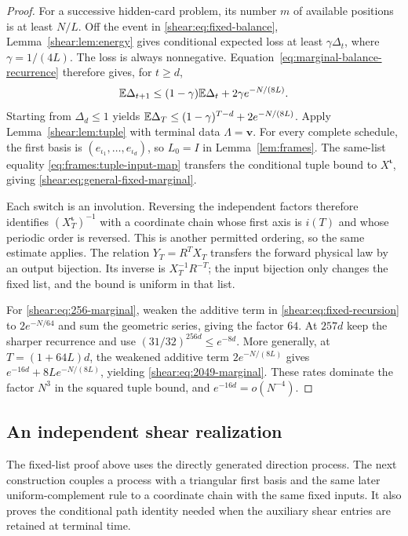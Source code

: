 \begin{proof}
For a successive hidden-card problem, its number $m$ of
available positions is at least $N/L$. Off the event in
\eqref{shear:eq:fixed-balance}, Lemma~\ref{shear:lem:energy}
gives conditional expected loss at least
$\gamma\Delta_t$, where $\gamma=1/(4L)$. The loss is always
nonnegative. Equation~\eqref{eq:marginal-balance-recurrence}
therefore gives, for $t\ge d$,
\begin{equation}\label{shear:eq:fixed-recursion}
 \mathbb E\Delta_{t+1}\le(1-\gamma)\mathbb E\Delta_t
       +2\gamma e^{-N/(8L)}.
\end{equation}
Starting from $\Delta_d\le1$ yields
$\mathbb E\Delta_T\le(1-\gamma)^{T-d}+2e^{-N/(8L)}$.
Apply Lemma~\ref{shear:lem:tuple} with terminal data
$\Lambda=\mathbf v$. For every complete schedule, the first
basis is $(e_{\iota_1},\ldots,e_{\iota_d})$, so $L_0=I$ in
Lemma~\ref{lem:frames}. The same-list equality
\eqref{eq:frames:tuple-input-map} transfers the conditional
tuple bound to $X^{\boldsymbol\iota}$, giving
\eqref{shear:eq:general-fixed-marginal}.

Each switch is an involution. Reversing the independent factors
therefore identifies $(X^{\boldsymbol\iota}_T)^{-1}$ with a
coordinate chain whose first axis is $i(T)$ and whose periodic
order is reversed. This is another permitted ordering, so the
same estimate applies. The relation $Y_T=R^TX_T$ transfers the
forward physical law by an output bijection. Its inverse is
$X_T^{-1}R^{-T}$; the input bijection only changes the fixed
list, and the bound is uniform in that list.

For \eqref{shear:eq:256-marginal}, weaken the additive term in
\eqref{shear:eq:fixed-recursion} to $2e^{-N/64}$ and sum the
geometric series, giving the factor $64$. At $257d$ keep the
sharper recurrence and use $(31/32)^{256d}\le e^{-8d}$.
More generally, at $T=(1+64L)d$, the weakened additive term
$2e^{-N/(8L)}$ gives $e^{-16d}+8Le^{-N/(8L)}$, yielding
\eqref{shear:eq:2049-marginal}. These rates dominate the factor
$N^3$ in the squared tuple bound, and $e^{-16d}=o(N^{-4})$.
\end{proof}

\subsection{An independent shear realization}

The fixed-list proof above uses the directly generated direction
process. The next construction couples a process with a triangular
first basis and the same later uniform-complement rule to a
coordinate chain with the same fixed inputs. It also proves the
conditional path identity needed when the auxiliary shear entries
are retained at terminal time.

